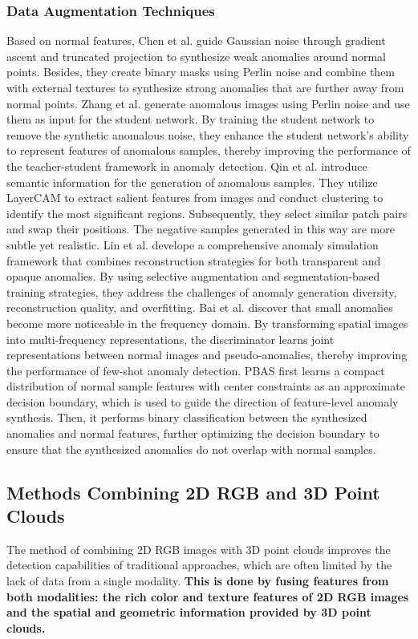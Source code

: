 \documentclass[journal,comsoc]{IEEEtran}
\begin{document}
\subsubsection{Data Augmentation Techniques}
Based on normal features, Chen et al. \cite{chen2025glass} guide Gaussian noise through gradient ascent and truncated projection to synthesize weak anomalies around normal points. Besides, they create binary masks using Perlin noise and combine them with external textures to synthesize strong anomalies that are further away from normal points. Zhang et al. \cite{zhang2023destseg} generate anomalous images using Perlin noise and use them as input for the student network. By training the student network to remove the synthetic anomalous noise, they enhance the student network’s ability to represent features of anomalous samples, thereby improving the performance of the teacher-student framework in anomaly detection. Qin et al. \cite{qin2024cutswap} introduce semantic information for the generation of anomalous samples. They utilize LayerCAM to extract salient features from images and conduct clustering to identify the most significant regions. Subsequently, they select similar patch pairs and swap their positions. The negative samples generated in this way are more subtle yet realistic. Lin et al. \cite{lin2024split} develope a comprehensive anomaly simulation framework that combines reconstruction strategies for both transparent and opaque anomalies. By using selective augmentation and segmentation-based training strategies, they address the challenges of anomaly generation diversity, reconstruction quality, and overfitting. Bai et al. \cite{bai2024dfd} discover that small anomalies become more noticeable in the frequency domain. By transforming spatial images into multi-frequency representations, the discriminator learns joint representations between normal images and pseudo-anomalies, thereby improving the performance of few-shot anomaly detection. PBAS \cite{chen2024pbas} first learns a compact distribution of normal sample features with center constraints as an approximate decision boundary, which is used to guide the direction of feature-level anomaly synthesis. Then, it performs binary classification between the synthesized anomalies and normal features, further optimizing the decision boundary to ensure that the synthesized anomalies do not overlap with normal samples.


\subsection{Methods Combining 2D RGB and 3D Point Clouds}
The method of combining 2D RGB images with 3D point clouds improves the detection capabilities of traditional approaches, which are often limited by the lack of data from a single modality. \textbf{This is done by fusing features from both modalities: the rich color and texture features of 2D RGB images and the spatial and geometric information provided by 3D point clouds.}
\end{document}
